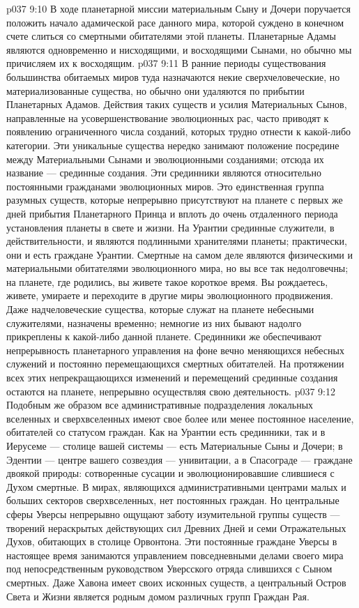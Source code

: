 \vs p037 9:10 В ходе планетарной миссии материальным Сыну и Дочери поручается положить начало адамической расе данного мира, которой суждено в конечном счете слиться со смертными обитателями этой планеты. Планетарные Адамы являются одновременно и нисходящими, и восходящими Сынами, но обычно мы причисляем их к восходящим.
\vs p037 9:11 \pc {} В ранние периоды существования большинства обитаемых миров туда назначаются некие сверхчеловеческие, но материализованные существа, но обычно они удаляются по прибытии Планетарных Адамов. Действия таких существ и усилия Материальных Сынов, направленные на усовершенствование эволюционных рас, часто приводят к появлению ограниченного числа созданий, которых трудно отнести к какой\hyp{}либо категории. Эти уникальные существа нередко занимают положение посредине между Материальными Сынами и эволюционными созданиями; отсюда их название --- срединные создания. Эти срединники являются относительно постоянными гражданами эволюционных миров. Это единственная группа разумных существ, которые непрерывно присутствуют на планете с первых же дней прибытия Планетарного Принца и вплоть до очень отдаленного периода установления планеты в свете и жизни. На Урантии срединные служители, в действительности, и являются подлинными хранителями планеты; практически, они и есть граждане Урантии. Смертные на самом деле являются физическими и материальными обитателями эволюционного мира, но вы все так недолговечны; на планете, где родились, вы живете такое короткое время. Вы рождаетесь, живете, умираете и переходите в другие миры эволюционного продвижения. Даже надчеловеческие существа, которые служат на планете небесными служителями, назначены временно; немногие из них бывают надолго прикреплены к какой\hyp{}либо данной планете. Срединники же обеспечивают непрерывность планетарного управления на фоне вечно меняющихся небесных служений и постоянно перемещающихся смертных обитателей. На протяжении всех этих непрекращающихся изменений и перемещений срединные создания остаются на планете, непрерывно осуществляя свою деятельность.
\vs p037 9:12 \pc Подобным же образом все административные подразделения локальных вселенных и сверхвселенных имеют свое более или менее постоянное население, обитателей со статусом граждан. Как на Урантии есть срединники, так и в Иерусеме --- столице вашей системы --- есть Материальные Сыны и Дочери; в Эдентии --- центре вашего созвездия --- унивитации, а в Спасограде --- граждане двоякой природы: сотворенные сусации и эволюционировавшие слившиеся с Духом смертные. В мирах, являющихся административными центрами малых и больших секторов сверхвселенных, нет постоянных граждан. Но центральные сферы Уверсы непрерывно ощущают заботу изумительной группы существ ---  творений нераскрытых действующих сил Древних Дней и семи Отражательных Духов, обитающих в столице Орвонтона. Эти постоянные граждане Уверсы в настоящее время занимаются управлением повседневными делами своего мира под непосредственным руководством Уверсского отряда слившихся с Сыном смертных. Даже Хавона имеет своих исконных существ, а центральный Остров Света и Жизни является родным домом различных групп Граждан Рая.
